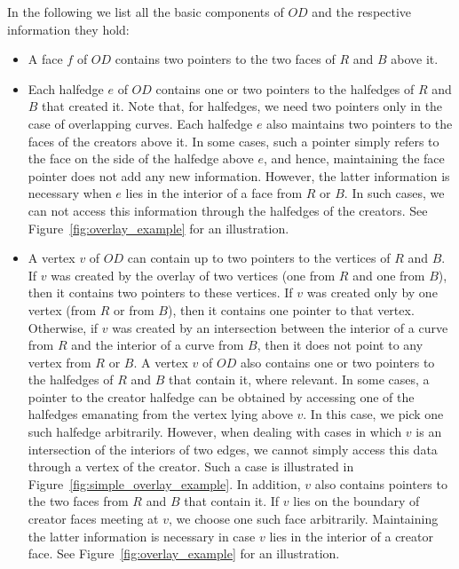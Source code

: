 \begin{ccTexOnly}
In the following we list all the basic components of $OD$ and 
the respective information they hold:
\begin{itemize}
\item A face $f$ of $OD$ contains two pointers 
to the two faces of $R$ and $B$ above it.
\item Each halfedge $e$ of $OD$ contains one or two pointers 
to the halfedges of $R$ and $B$ that created it. 
Note that, for halfedges, we need two pointers only 
in the case of overlapping curves. 
Each halfedge $e$ also maintains two pointers to the faces of the 
creators above it. 
In some cases, such a pointer simply refers to the face on the 
side of the halfedge above $e$, and hence, maintaining the face 
pointer does not add any new information. 
However, the latter information is necessary when $e$ lies in 
the interior of a face from $R$ or $B$.
In such cases, we can not access this information through the 
halfedges of the creators. 
See Figure~\ref{fig:overlay_example} for an illustration.
\item A vertex $v$ of $OD$ can contain up to two pointers to the 
vertices of $R$ and $B$. If $v$ was created by the overlay of 
two vertices (one from $R$ and one from $B$), then it contains 
two pointers to these vertices.
If $v$ was created only by one vertex (from $R$ or from $B$), then 
it contains one pointer to that vertex. Otherwise, if $v$ was 
created by an intersection between the interior of a curve from 
$R$ and the interior of a curve from $B$, then it does not point 
to any vertex from $R$ or $B$. 
A vertex $v$ of $OD$ also contains one or two pointers 
to the halfedges of $R$ and $B$ that contain it, where relevant. 
In some cases, a pointer to the creator halfedge can be obtained by 
accessing one of the halfedges emanating from the vertex lying above 
$v$. In this case, we pick one such halfedge arbitrarily.
However, when dealing with cases in which $v$ is an intersection 
of the interiors of two edges, 
we cannot simply access this data through a vertex of the creator.
Such a case is illustrated in Figure~\ref{fig:simple_overlay_example}.
In addition, $v$ also contains pointers to the two 
faces from $R$ and $B$ that contain it. 
If $v$ lies on the boundary of creator faces meeting at $v$,
we choose one such face arbitrarily.
Maintaining the latter information is necessary 
in case $v$ lies in the interior of a creator face.
See Figure~\ref{fig:overlay_example} for an illustration.
\end{itemize}



\end{ccTexOnly}
